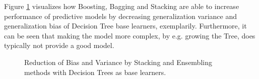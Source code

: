 \documentclass[12pt]{article}
\begin{document}
Figure \ref{bv} visualizes how  Boosting, Bagging and Stacking are able to increase performance of predictive models by decreasing generalization variance and generalization bias of Decision Tree base learners, exemplarily. Furthermore, it can be seen that making the model more complex, by e.g. growing the Tree, does typically not provide a good model.

\begin{figure}[!htp] 
\caption[Bias and Variance Reduction]{Reduction of Bias and Variance by Stacking and Ensembling methods with Decision Trees as base learners.}\label{bv}
\end{figure} 
\end{document}
